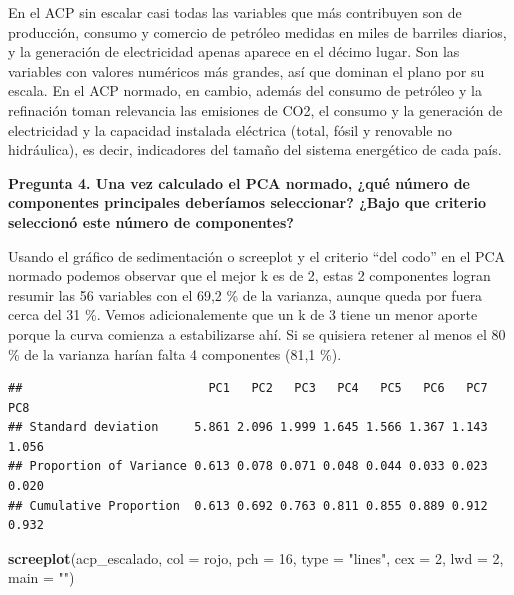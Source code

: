 \documentclass[
]{article}
\newenvironment{Shaded}{\begin{snugshade}}{\end{snugshade}}
\newcommand{\AttributeTok}[1]{\textcolor[rgb]{0.13,0.29,0.53}{#1}}
\newcommand{\CommentTok}[1]{\textcolor[rgb]{0.56,0.35,0.01}{\textit{#1}}}
\newcommand{\DecValTok}[1]{\textcolor[rgb]{0.00,0.00,0.81}{#1}}
\newcommand{\FunctionTok}[1]{\textcolor[rgb]{0.13,0.29,0.53}{\textbf{#1}}}
\newcommand{\NormalTok}[1]{#1}
\newcommand{\SpecialCharTok}[1]{\textcolor[rgb]{0.81,0.36,0.00}{\textbf{#1}}}
\newcommand{\StringTok}[1]{\textcolor[rgb]{0.31,0.60,0.02}{#1}}
\begin{document}
En el ACP sin escalar casi todas las variables que más contribuyen son
de producción, consumo y comercio de petróleo medidas en miles de
barriles diarios, y la generación de electricidad apenas aparece en el
décimo lugar. Son las variables con valores numéricos más grandes, así
que dominan el plano por su escala. En el ACP normado, en cambio, además
del consumo de petróleo y la refinación toman relevancia las emisiones
de CO2, el consumo y la generación de electricidad y la capacidad
instalada eléctrica (total, fósil y renovable no hidráulica), es decir,
indicadores del tamaño del sistema energético de cada país.

\noindent\textbf{Pregunta 4. Una vez calculado el PCA normado, ¿qué número de componentes principales deberíamos seleccionar? ¿Bajo que criterio seleccionó este número de componentes?}

Usando el gráfico de sedimentación o screeplot y el criterio ``del
codo'' en el PCA normado podemos observar que el mejor k es de 2, estas
2 componentes logran resumir las 56 variables con el 69,2 \% de la
varianza, aunque queda por fuera cerca del 31 \%. Vemos adicionalemente
que un k de 3 tiene un menor aporte porque la curva comienza a
estabilizarse ahí. Si se quisiera retener al menos el 80 \% de la
varianza harían falta 4 componentes (81,1 \%).

\begin{Shaded}
\end{Shaded}

\begin{verbatim}
##                          PC1   PC2   PC3   PC4   PC5   PC6   PC7   PC8
## Standard deviation     5.861 2.096 1.999 1.645 1.566 1.367 1.143 1.056
## Proportion of Variance 0.613 0.078 0.071 0.048 0.044 0.033 0.023 0.020
## Cumulative Proportion  0.613 0.692 0.763 0.811 0.855 0.889 0.912 0.932
\end{verbatim}

\begin{Shaded}
\begin{Highlighting}[]
\FunctionTok{screeplot}\NormalTok{(acp\_escalado, }\AttributeTok{col =}\NormalTok{ rojo, }\AttributeTok{pch =} \DecValTok{16}\NormalTok{,}
          \AttributeTok{type =} \StringTok{"lines"}\NormalTok{, }\AttributeTok{cex =} \DecValTok{2}\NormalTok{, }\AttributeTok{lwd =} \DecValTok{2}\NormalTok{, }\AttributeTok{main =} \StringTok{""}\NormalTok{)}
\end{Highlighting}
\end{Shaded}
\end{document}

